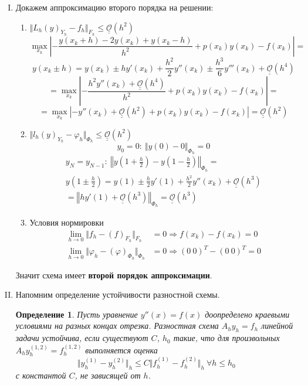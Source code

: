 \documentclass[12pt]{article}
\newtheorem*{definition}{Определение}
\def\bigO{ \underline{\underline{\mathcal{O}}} }
\begin{document}
    \newpage

    \begin{enumerate}[I.]
        \item Докажем аппроксимацию второго порядка на решении:
        \begin{enumerate}
            \item $\Vert L_h(y)_{Y_h}-f_h\Vert_{F_h}\leq\bigO(h^2)$
            \[\max_{x_k}\left|-\frac{y(x_k+h)-2y(x_k)+y(x_k-h)}{h^2}+p(x_k)y(x_k)-f(x_k)\right|=\]
            \[y(x_k\pm h)=y(x_k)\pm hy'(x_k)+\frac{h^2}{2}y''(x_k)\pm\frac{h^3}{6}y'''(x_k)+\bigO(h^4)\]
            \[=\max_{x_k}\left|-\frac{h^2y''(x_k)+\bigO(h^4)}{h^2}+p(x_k)y(x_k)-f(x_k)\right|=\]
            \[=\max_{x_k}\left|-y''(x_k)+\bigO(h^2)+p(x_k)y(x_k)-f(x_k)\right|=\bigO(h^2)\]
            \item $\Vert l_h(y)_{Y_h}-\varphi_h\Vert_{\Phi_h}\leq\bigO(h^2)$
                \[y_0 = 0:\ \Vert y(0)-0\Vert_{\Phi_h}=0\]
                \begin{multline*}
                    y_N = y_{N-1}:\ \left\Vert y\left(1+\frac{h}{2}\right)-y\left(1-\frac{h}{2}\right)\right\Vert_{\Phi_h}= \\
                    y\left(1\pm \frac{h}{2}\right)=y(1)\pm \frac{h}{2}y'(1)+\frac{h^2}{2}y''(x_k)+\bigO(h^3) \\
                    =\left\Vert hy'(1)+\bigO(h^3)\right\Vert_{\Phi_h}=\bigO(h^3)
                \end{multline*}
            \item Условия нормировки
            \begin{align*}
                \lim_{h\rightarrow0}\Vert f_h-(f)_{F_h}\Vert_{F_h}&=0 \Rightarrow f(x_k)-f(x_k) = 0\\
                \lim_{h\rightarrow0}\Vert \varphi_h-(\varphi)_{\Phi_h}\Vert_{\Phi_h}&=0 \Rightarrow (0\ 0)^T - (0\ 0)^T = 0
            \end{align*}
        \end{enumerate}
        Значит схема имеет \textbf{второй порядок аппроксимации}.
        \newpage

        \item Напомним определение устойчивости разностной схемы.
        \begin{definition}
            Пусть уравнение $y''(x)=f(x)$ доопределено краевыми
            условиями на разных концах отрезка. Разностная схема
            $A_hy_h = f_h$ линейной задачи устойчива, если существуют $C$, $h_0$ такие, что для
            произвольных $A_hy^{(1,2)}_h = f^{(1,2)}_h$ выполняется оценка
            \[\Vert y^{(1)}_h-y^{(2)}_h\Vert_h\leq C\Vert f^{(1)}_h -f^{(2)}_h\Vert_h\ \forall h\leq h_0\]
            с константой $C$, не зависящей от $h$.
        \end{definition}


\end{enumerate}
\end{document}

